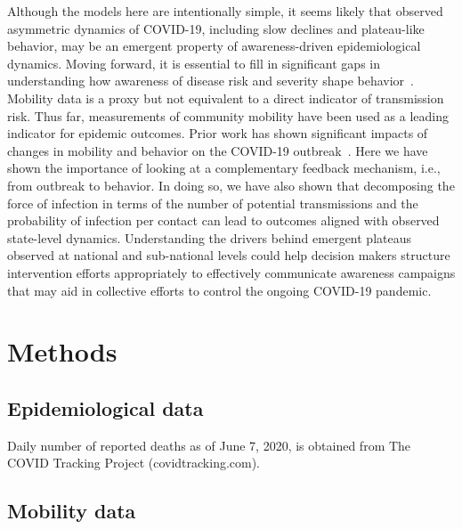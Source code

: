 Although the models here are intentionally simple,
it seems likely that observed asymmetric dynamics of COVID-19, including
slow declines and plateau-like behavior, may be an emergent
property of awareness-driven epidemiological dynamics.
%
%
Moving forward, it is essential to fill in significant
gaps in understanding how awareness of disease
risk and severity shape behavior~\citep{west_nat2020}. 
Mobility data is a proxy but
not equivalent to a direct indicator of transmission
risk. Thus far, measurements of community
mobility have been
used as a leading indicator for epidemic outcomes.
Prior work has shown significant impacts of changes
in mobility and behavior on the COVID-19 outbreak~\citep{kraemer_2020sci}.
Here we have
shown the importance of looking at a complementary feedback
mechanism,
i.e., from outbreak to behavior.  
In doing so, we have also shown that decomposing the 
force of infection in terms of the number of potential
transmissions and the probability of infection per contact
can lead to outcomes aligned with observed state-level dynamics.
Understanding the drivers behind emergent plateaus observed
at national and sub-national levels could help decision
makers structure intervention efforts appropriately to effectively 
communicate awareness campaigns that may aid in collective
efforts to control the ongoing COVID-19 pandemic.


\section{Methods}

\subsection{Epidemiological data}

Daily number of reported deaths as of June 7, 2020, is obtained from The COVID Tracking Project (covidtracking.com).

\subsection{Mobility data}

